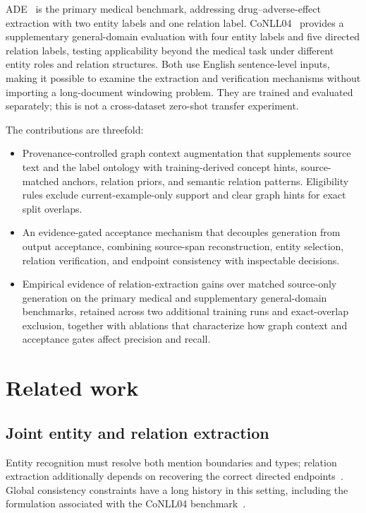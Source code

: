 \documentclass[a4paper,fleqn,numbers,doubleblind]{cas-dc}
\begin{document}
ADE~\cite{gurulingappa2012ade} is the primary medical benchmark, addressing
drug--adverse-effect extraction with two entity labels and one relation label.
CoNLL04~\cite{roth2004conll} provides a supplementary general-domain evaluation
with four entity labels and five directed relation labels, testing applicability
beyond the medical task under different entity roles and relation structures.
Both use English sentence-level inputs, making it possible to examine
the extraction and verification mechanisms without importing a long-document
windowing problem. They are trained and evaluated separately; this is not a
cross-dataset zero-shot transfer experiment.

The contributions are threefold:
\begin{itemize}
\item Provenance-controlled graph context augmentation that supplements source
text and the label ontology with training-derived concept hints, source-matched
anchors, relation priors, and semantic relation patterns. Eligibility rules
exclude current-example-only support and clear graph hints for exact split overlaps.
\item An evidence-gated acceptance mechanism that decouples generation from
output acceptance, combining source-span reconstruction, entity selection,
relation verification, and endpoint consistency with inspectable decisions.
\item Empirical evidence of relation-extraction gains over matched source-only
generation on the primary medical and supplementary general-domain benchmarks,
retained across two additional training runs and
exact-overlap exclusion, together with ablations that characterize how graph
context and acceptance gates affect precision and recall.
\end{itemize}

\section{Related work}
\label{sec:related}
\subsection{Joint entity and relation extraction}
Entity recognition must resolve both mention boundaries and types; relation
extraction additionally depends on recovering the correct directed
endpoints~\cite{li2022ner}. Global consistency constraints have a long history
in this setting, including the formulation associated with the CoNLL04
benchmark~\cite{roth2004conll}.
\end{document}
